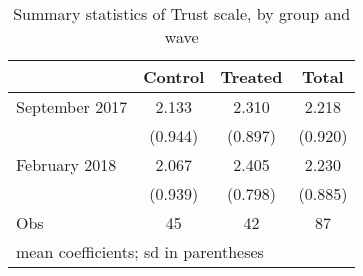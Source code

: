 \begin{table}\centering
\caption{Summary statistics of Trust scale, by group and wave}
\begin{tabular}{l*{3}{c}} \toprule
            &     Control&     Treated&       Total\\
\midrule
September 2017&       2.133&       2.310&       2.218\\
            &     (0.944)&     (0.897)&     (0.920)\\
February 2018&       2.067&       2.405&       2.230\\
            &     (0.939)&     (0.798)&     (0.885)\\
\midrule
Obs      &         45 &          42  &          87  \\
\bottomrule
\multicolumn{4}{l}{\footnotesize mean coefficients; sd in parentheses}\\
\end{tabular}
\label{tab:sum_trust}
\end{table}